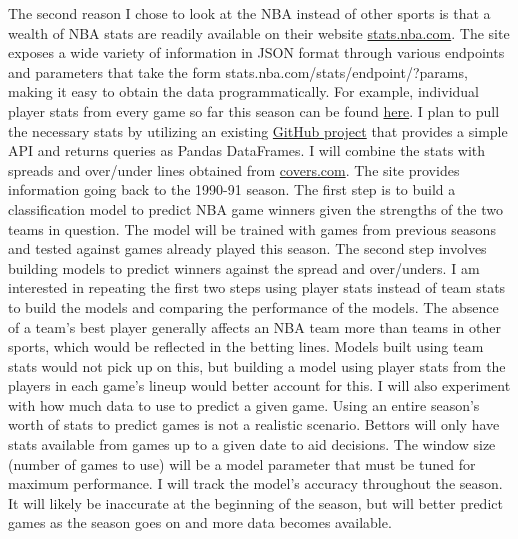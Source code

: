 \documentclass{article}
\begin{document}
\bigbreak
The second reason I chose to look at the NBA instead of other sports is that a wealth of NBA stats are readily available on their website \url{stats.nba.com}. The site exposes a wide variety of information in JSON format through various endpoints and parameters that take the form stats.nba.com/stats/{endpoint}/?{params}, making it easy to obtain the data programmatically. For example, individual player stats from every game so far this season can be found \href{http://stats.nba.com/stats/leaguegamelog/?LeagueID=00&Season=2016-17&SeasonType=Regular\%20Season&PlayerOrTeam=P&Sorter=PTS&Direction=DESC}{here}. I plan to pull the necessary  stats by utilizing an existing \href{https://github.com/seemethere/nba_py}{GitHub project} that provides a simple API and returns queries as Pandas DataFrames. I will combine the stats with spreads and over/under lines obtained from \url{covers.com}. The site provides information going back to the 1990-91 season.
\bigbreak
The first step is to build a classification model to predict NBA game winners given the strengths of the two teams in question. The model will be trained with games from previous seasons and tested against games already played this season. The second step involves building models to predict winners against the spread and over/unders. I am interested in repeating the first two steps using player stats instead of team stats to build the models and comparing the performance of the models. The absence of a team's best player generally affects an NBA team more than teams in other sports, which would be reflected in the betting lines. Models built using team stats would not pick up on this, but building a model using player stats from the players in each game's lineup would better account for this. I will also experiment with how much data to use to predict a given game. Using an entire season's worth of stats to predict games is not a realistic scenario. Bettors will only have stats available from games up to a given date to aid decisions. The window size (number of games to use) will be a model parameter that must be tuned for maximum performance. I will track the model's accuracy throughout the season. It will likely be inaccurate at the beginning of the season, but will better predict games as the season goes on and more data becomes available.
\end{document}
